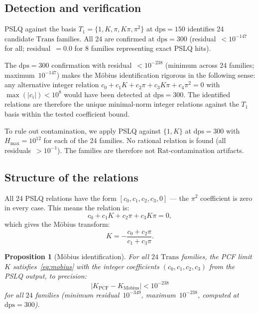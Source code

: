 \documentclass[12pt, reqno]{amsart}
\newtheorem{proposition}[theorem]{Proposition}
\theoremstyle{definition}
\theoremstyle{remark}
\newcommand{\Rat}{\mathrm{Rat}}
\newcommand{\Trans}{\mathrm{Trans}}
\begin{document}
\subsection{Detection and verification}\label{ssec:detection}

PSLQ against the basis $T_1 = \{1, K, \pi, K\pi, \pi^2\}$ at $\mathrm{dps}=150$ identifies 24 candidate
$\Trans$ families. All 24 are confirmed at $\mathrm{dps}=300$ (residual~$< 10^{-147}$ for all;
residual~$= 0.0$ for 8 families representing exact PSLQ hits).

The $\mathrm{dps}=300$ confirmation with residual~$< 10^{-238}$
(minimum across 24 families; maximum~$10^{-147}$) makes
the M\"obius identification rigorous in the following
sense: any alternative integer relation
$c_0 + c_1 K + c_2\pi + c_3 K\pi + c_4\pi^2 = 0$ with
$\max(|c_i|) < 10^8$ would have been detected at $\mathrm{dps}=300$.
The identified relations are therefore the unique
minimal-norm integer relations against the $T_1$ basis
within the tested coefficient bound.

To rule out contamination, we apply PSLQ against $\{1, K\}$ at $\mathrm{dps}=300$ with
$H_{\max}=10^{12}$ for each of the 24 families. No rational relation is found
(all residuals~$> 10^{-1}$). The families are therefore not $\Rat$-contamination artifacts.

\subsection{Structure of the relations}\label{ssec:structure}

All 24 PSLQ relations have the form $[c_0, c_1, c_2, c_3, 0]$ --- the $\pi^2$ coefficient
is zero in every case. This means the relation is:
\[
  c_0 + c_1 K + c_2\pi + c_3 K\pi = 0,
\]
which gives the M\"obius transform:
\begin{equation}\label{eq:mobius}
  K = -\frac{c_0 + c_2\pi}{c_1 + c_3\pi}.
\end{equation}

\begin{proposition}[M\"obius identification]\label{prop:mobius}
For all $24$ $\Trans$ families,
the PCF limit~$K$ satisfies~\eqref{eq:mobius} with the integer coefficients $(c_0, c_1, c_2, c_3)$
from the PSLQ output, to precision:
\[
  |K_{\mathrm{PCF}} - K_{\mathrm{M\ddot{o}bius}}| < 10^{-238}
\]
for all $24$ families (minimum residual~$10^{-349}$, maximum~$10^{-238}$, computed at $\mathrm{dps}=300$).
\end{proposition}
\end{document}
